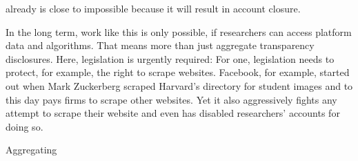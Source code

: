 {already is close to
impossible because it will result in account closure.






In the long term, work like this is only possible, if researchers can access
platform data and algorithms. That means more than just aggregate transparency
disclosures. Here, legislation is urgently required: For one, legislation needs
to protect, for example, the right to scrape websites. Facebook, for example,
started out when Mark Zuckerberg scraped Harvard's directory for student images
and to this day pays firms to scrape other websites. Yet it also aggressively
fights any attempt to scrape their website and even has disabled researchers'
accounts for doing so.

Aggregating


}
